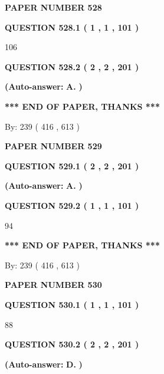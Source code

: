 \documentclass{ctexart}
\begin{document}
   
 {\textbf{ \Large{ PAPER NUMBER  528  }}}
   
   
   
   
  
  
{\textbf{\large{QUESTION
528.1 
 ( 1 , 1 , 101 )
}}}

106
  
  
{\textbf{\large{QUESTION
528.2 
 ( 2 , 2 , 201 )
}}}
 
 
{\textbf{(Auto-answer:}}
{\textbf{\large{
A.}}}
{\textbf{)}}
 
 
   
   
   
   
\vspace{1.0in} 
{\textbf{\large{ *** END OF PAPER, THANKS *** }}} 
   
   
\hspace{1.0in} By: 
 239 ( 416 ,  613 )
   
   
   
   
\newpage 
\setcounter{page}{ 
   529001 } 
   
   
 {\textbf{ \Large{ PAPER NUMBER  529  }}}
   
   
   
   
  
  
{\textbf{\large{QUESTION
529.1 
 ( 2 , 2 , 201 )
}}}
 
 
{\textbf{(Auto-answer:}}
{\textbf{\large{
A.}}}
{\textbf{)}}
 
 
  
  
{\textbf{\large{QUESTION
529.2 
 ( 1 , 1 , 101 )
}}}

94
   
   
   
   
\vspace{1.0in} 
{\textbf{\large{ *** END OF PAPER, THANKS *** }}} 
   
   
\hspace{1.0in} By: 
 239 ( 416 ,  613 )
   
   
   
   
\newpage 
\setcounter{page}{ 
   530001 } 
   
   
 {\textbf{ \Large{ PAPER NUMBER  530  }}}
   
   
   
   
  
  
{\textbf{\large{QUESTION
530.1 
 ( 1 , 1 , 101 )
}}}

88
  
  
{\textbf{\large{QUESTION
530.2 
 ( 2 , 2 , 201 )
}}}
 
 
{\textbf{(Auto-answer:}}
{\textbf{\large{
D.}}}
{\textbf{)}}
 
\end{document}
